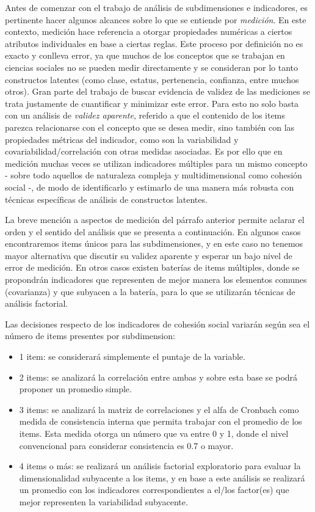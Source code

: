 \documentclass[
  12pt,
]{book}
\begin{document}
Antes de comenzar con el trabajo de análisis de subdimensiones e indicadores, es pertinente hacer algunos alcances sobre lo que se entiende por \emph{medición}. En este contexto, medición hace referencia a otorgar propiedades numéricas a ciertos atributos individuales en base a ciertas reglas. Este proceso por definición no es exacto y conlleva error, ya que muchos de los conceptos que se trabajan en ciencias sociales no se pueden medir directamente y se consideran por lo tanto constructos latentes (como clase, estatus, pertenencia, confianza, entre muchos otros). Gran parte del trabajo de buscar evidencia de validez de las mediciones se trata justamente de cuantificar y minimizar este error. Para esto no solo basta con un análisis de \emph{validez aparente}, referido a que el contenido de los items parezca relacionarse con el concepto que se desea medir, sino también con las propiedades métricas del indicador, como son la variabilidad y covariabilidad/correlación con otras medidas asociadas. Es por ello que en medición muchas veces se utilizan indicadores múltiples para un mismo concepto - sobre todo aquellos de naturaleza compleja y multidimensional como cohesión social -, de modo de identificarlo y estimarlo de una manera más robusta con técnicas específicas de análisis de constructos latentes.

La breve mención a aspectos de medición del párrafo anterior permite aclarar el orden y el sentido del análisis que se presenta a continuación. En algunos casos encontraremos items únicos para las subdimensiones, y en este caso no tenemos mayor alternativa que discutir su validez aparente y esperar un bajo nivel de error de medición. En otros casos existen baterías de items múltiples, donde se propondrán indicadores que representen de mejor manera los elementos comunes (covarianza) y que subyacen a la batería, para lo que se utilizarán técnicas de análisis factorial.

Las decisiones respecto de los indicadores de cohesión social variarán según sea el número de items presentes por subdimension:

\begin{itemize}
\item
  1 item: se considerará simplemente el puntaje de la variable.
\item
  2 items: se analizará la correlación entre ambas y sobre esta base se podrá proponer un promedio simple.
\item
  3 items: se analizará la matriz de correlaciones y el alfa de Cronbach como medida de consistencia interna que permita trabajar con el promedio de los items. Esta medida otorga un número que va entre 0 y 1, donde el nivel convencional para considerar consistencia es 0.7 o mayor.
\item
  4 items o más: se realizará un análisis factorial exploratorio para evaluar la dimensionalidad subyacente a los items, y en base a este análisis se realizará un promedio con los indicadores correspondientes a el/los factor(es) que mejor representen la variabilidad subyacente.
\end{itemize}
\end{document}
